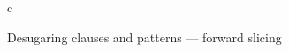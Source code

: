 
\begin{figure}[H]
\flushleft{}
\begin{smathpar}
{
   c \concat {}
   \desugarClauseFwd
   \tau
}
\end{smathpar}
\caption{Desugaring clauses and patterns --- forward slicing}
\end{figure}
